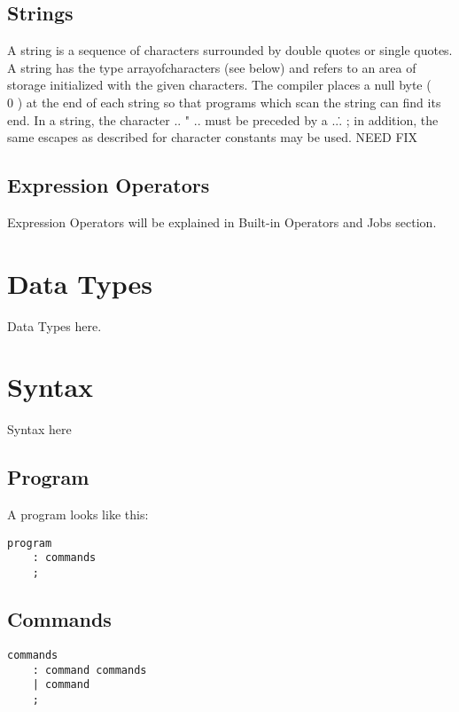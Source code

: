 \documentclass[prodmode,acmtecs]{acmsmall}
\begin{document}
\subsection{Strings}

A string is a sequence of characters surrounded by double quotes or single
quotes.
A string has the type arrayofcharacters
(see below) and refers to an area of storage initialized with the given
characters. The compiler places a null byte ( \\0 ) at the end of each
string so that programs which scan the string can find its end. In a
string, the character ..  " ..  must be preceded by a ..\.. ; in
addition, the same escapes as described for character constants may be used.
NEED FIX

\subsection{Expression Operators}
Expression Operators will be explained in Built-in Operators and Jobs section.

\section{Data Types}

Data Types here.

\section{Syntax}

Syntax here

\subsection{Program}

A program looks like this:

\begin{lstlisting}
program
	: commands
	;
\end{lstlisting}


\subsection{Commands}

\begin{lstlisting}
commands
	: command commands
	| command
	;
\end{lstlisting}
\end{document}
